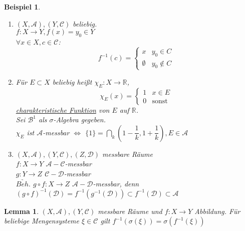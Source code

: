 \documentclass[11pt]{memoir}
\theoremstyle{break}
\newtheorem{Beispiel}{Beispiel}[chapter]
\newtheorem{Lemma}{Lemma}[chapter]
\begin{document}
\begin{Beispiel} 

\begin{enumerate}
	\item $(X, \mathscr{A}), (Y, \mathscr{C})$ beliebig. \\
	$f: X \rightarrow Y, f(x) = y_0 \in Y$ \\
	$\forall x \in X, c \in \mathscr{C}$: 
	\begin{equation}
		f^{-1}(c) = 
		\begin{cases}
			x & y_0 \in C \\
			\emptyset & y_0 \notin C
		\end{cases}
	\end{equation}
	\item Für $E \subset X$ beliebig heißt $\chi_E: X \rightarrow \mathbb{R}$, \\
	\begin{equation}
		\chi_E(x) =
		\begin{cases}
			1 & x \in E \\
			0 & \text{sonst}
		\end{cases}
	\end{equation}
	\underline{charakteristische Funktion} von $E$ auf $\mathbb{R}$. \\
	Sei $\mathscr{B}^1$ als $\sigma$-Algebra gegeben. \\
	$\chi_E$ ist $\mathscr{A}$-messbar $\Leftrightarrow$ $\{1\} = \bigcap\limits_k \left(1- \dfrac{1}{k}, 1 + \dfrac{1}{k}\right), E \in \mathscr{A}$
	\item $(X, \mathscr{A}), (Y, \mathscr{C}), (Z, \mathscr{D})$ messbare Räume \\
	$f: X \rightarrow Y$ $ \mathscr{A}-\mathscr{C}$-messbar \\
	$g: Y \rightarrow Z$ $ \mathscr{C}-\mathscr{D}$-messbar \\
	$\underrightarrow{Beh.}$ $  g \circ f: X \rightarrow Z$ $ \mathscr{A}-\mathscr{D}$-messbar, denn \\
	$(g \circ f)^{-1}(\mathscr{D}) = f^{-1}(g^{-1}(\mathscr{D})) \subset f^{-1}(\mathscr{D}) \subset \mathscr{A}$
\end{enumerate}
\end{Beispiel}

\begin{Lemma}
$(X, \mathscr{A}), (Y, \mathscr{C})$ messbare Räume und $f: X \rightarrow Y$ Abbildung. Für beliebige Mengensysteme $\xi \in \mathscr{C}$ gilt $f^{-1}(\sigma(\xi)) = \sigma(f^{-1}(\xi))$
\end{Lemma}
\end{document}
